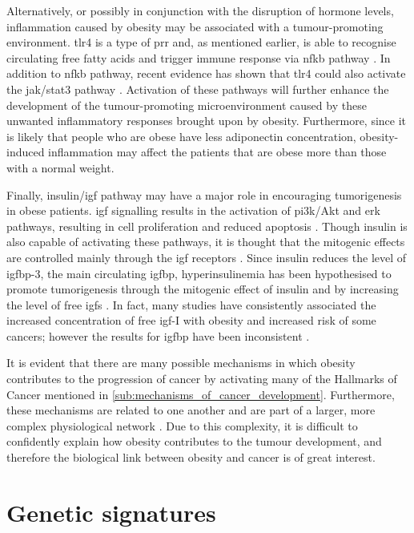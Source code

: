 Alternatively, or possibly in conjunction with the disruption of hormone levels, inflammation caused by obesity may be associated with a tumour-promoting environment.
\Gls{tlr}4 is a type of \gls{prr} and, as mentioned earlier, is able to recognise circulating free fatty acids and trigger immune response via \gls{nfkb} pathway \citep{Lumeng2011}.
In addition to \gls{nfkb} pathway, recent evidence has shown that \gls{tlr}4 could also activate the \gls{jak}/\gls{stat3} pathway \citep{Yu2014}.
Activation of these pathways will further enhance the development of the tumour-promoting microenvironment caused by these unwanted inflammatory responses brought upon by obesity.
Furthermore, since it is likely that people who are obese have less adiponectin concentration, obesity-induced inflammation may affect the patients that are obese more than those with a normal weight.

Finally, insulin/\gls{igf} pathway may have a major role in encouraging tumorigenesis in obese patients.
\gls{igf} signalling results in the activation of \gls{pi3k}/Akt and \gls{erk} pathways, resulting in cell proliferation and reduced apoptosis \citep{Roberts2010}.
Though insulin is also capable of activating these pathways, it is thought that the mitogenic effects are controlled mainly through the \gls{igf} receptors \citep{Roberts2010}.
Since insulin reduces the level of \gls{igfbp}-3, the main circulating \gls{igfbp}, hyperinsulinemia has been hypothesised to promote tumorigenesis through the mitogenic effect of insulin and by increasing the level of free \glspl{igf} \citep{Giovannucci1995,Mckeown1994,Roberts2010}.
In fact, many studies have consistently associated the increased concentration of free \gls{igf}-I with obesity and increased risk of some cancers; however the results for \gls{igfbp} have been inconsistent \citep{Basen2011}.

It is evident that there are many possible mechanisms in which obesity contributes to the progression of cancer by activating many of the Hallmarks of Cancer mentioned in \cref{sub:mechanisms_of_cancer_development}.
Furthermore, these mechanisms are related to one another and are part of a larger, more complex physiological network \citep{Renehan2006}.
Due to this complexity, it is difficult to confidently explain how obesity contributes to the tumour development, and therefore the biological link between obesity and cancer is of great interest.

\section{Genetic signatures}
\label{sec:genetic_signatures}

